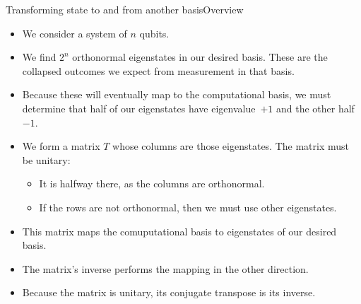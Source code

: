 \begin{frame}{Transforming state to and from another basis}{Overview}

\begin{itemize}
    \item We consider a system of $n$ qubits.
    \item We find $2^n$ orthonormal eigenstates in our desired basis. These are the collapsed outcomes we expect from measurement in that basis.
    \item Because these will eventually map to the computational basis, we must determine that half of our eigenstates have eigenvalue~$+1$ and the other half~$-1$.
    \item We form a matrix $T$ whose columns are those eigenstates.  The matrix must be unitary:
    \begin{itemize}
        \item It is halfway there, as the columns are orthonormal.  
        \item If the rows are not orthonormal, then we must use other eigenstates.
    \end{itemize}
    \item This matrix maps the comuputational basis to eigenstates of our desired basis.
    \item The matrix's inverse performs the mapping in the other direction.
    \item Because the matrix is unitary, its conjugate transpose is its inverse.
\end{itemize}
\end{frame}

